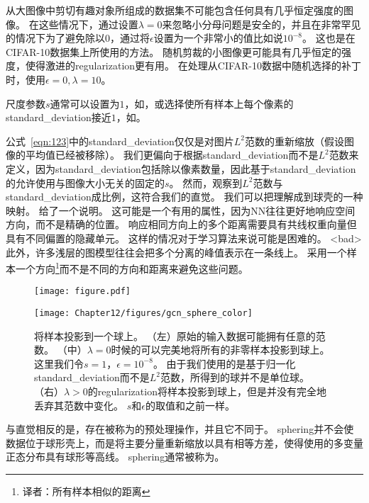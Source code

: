 从大图像中剪切有趣对象所组成的数据集不可能包含任何具有几乎恒定强度的图像。
在这些情况下，通过设置$\lambda = 0$来忽略小分母问题是安全的，并且在非常罕见的情况下为了避免除以$0$，通过将$\epsilon$设置为一个非常小的值比如说$10^{-8}$。
这也是\citet{Goodfellow+al-arxiv-2013}在CIFAR-10数据集上所使用的方法。
随机剪裁的小图像更可能具有几乎恒定的强度，使得激进的\gls{regularization}更有用。
在处理从CIFAR-10数据中随机选择的补丁时，\citet{Coates2011}使用$\epsilon = 0, \lambda = 10$。

尺度参数$s$通常可以设置为$1$，如\citet{Coates2011}，或选择使所有样本上每个像素的\gls{standard_deviation}接近$1$，如\citet{Goodfellow+al-arxiv-2013}。


公式~\eqref{eqn:123}中的\gls{standard_deviation}仅仅是对图片$L^2$范数的重新缩放（假设图像的平均值已经被移除）。
我们更偏向于根据\gls{standard_deviation}而不是$L^2$范数来定义，因为\gls{standard_deviation}包括除以像素数量，因此基于\gls{standard_deviation}的允许使用与图像大小无关的固定的$s$。
然而，观察到$L^2$范数与\gls{standard_deviation}成比例，这符合我们的直觉。
我们可以把理解成到球壳的一种映射。
给了一个说明。
这可能是一个有用的属性，因为\gls{NN}往往更好地响应空间方向，而不是精确的位置。
响应相同方向上的多个距离需要具有共线权重向量但具有不同偏置的隐藏单元。
这样的情况对于学习算法来说可能是困难的。
<bad>此外，许多浅层的图模型往往会把多个分离的峰值表示在一条线上。
采用一个样本一个方向\footnote{译者：所有样本相似的距离}而不是不同的方向和距离来避免这些问题。

\begin{figure}[!htb]
\ifOpenSource
\centerline{\texttt{[image: figure.pdf]}}
\else
	\centerline{\texttt{[image: Chapter12/figures/gcn\_sphere\_color]}}
\fi
	\caption{将样本投影到一个球上。
（左）原始的输入数据可能拥有任意的范数。
（中）$\lambda=0$时候的可以完美地将所有的非零样本投影到球上。
这里我们令$s=1$，$\epsilon = 10^{-8}$。
由于我们使用的是基于归一化\gls{standard_deviation}而不是$L^2$范数，所得到的球并不是单位球。
（右）$\lambda>0$的\gls{regularization}将样本投影到球上，但是并没有完全地丢弃其范数中变化。
$s$和$\epsilon$的取值和之前一样。}
\label{fig:gcn_sphere_color}
\end{figure}


与直觉相反的是，存在被称为的预处理操作，并且它不同于。
\gls{sphering}并不会使数据位于球形壳上，而是将主要分量重新缩放以具有相等方差，使得使用的多变量正态分布具有球形等高线。 
\gls{sphering}通常被称为。



